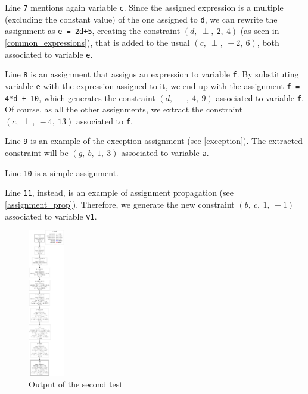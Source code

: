 \documentclass{article}
\newcommand{\spc}{\:}
\newcommand{\constraint}[4]{(#1,\spc #2,\spc #3,\spc #4)}
\newcommand{\linenum}[1]{\texttt{#1}}
\begin{document}
Line \linenum{7} mentions again variable \texttt{c}. Since the assigned expression is a multiple (excluding the constant value) of the one assigned to \texttt{d}, we can rewrite the assignment as \texttt{e = 2d+5}, creating the constraint $\constraint{d}{\perp}{2}{4}$ (as seen in \ref{common_expressions}), that is added to the usual $\constraint{c}{\perp}{-2}{6}$, both associated to variable \texttt{e}.

Line \linenum{8} is an assignment that assigns an expression to variable \texttt{f}. By substituting variable \texttt{e} with the expression assigned to it, we end up with the assignment \texttt{f = 4*d + 10}, which generates the constraint $\constraint{d}{\perp}{4}{9}$ associated to variable \texttt{f}. Of course, as all the other assignments, we extract the constraint $\constraint{c}{\perp}{-4}{13}$ associated to \texttt{f}.

Line \linenum{9} is an example of the exception assignment (see \ref{exception}). The extracted constraint will be $\constraint{g}{b}{1}{3}$ associated to variable \texttt{a}.

Line \linenum{10} is a simple assignment.

Line \linenum{11}, instead, is an example of assignment propagation (see \ref{assignment_prop}). Therefore, we generate the new  constraint $\constraint{b}{c}{1}{-1}$ associated to variable \texttt{v1}.



\begin{figure}[H]
    \centering
    \includegraphics[width=0.14\textwidth]{test2.pdf} %
    \caption{Output of the second test}
\end{figure}
\end{document}

